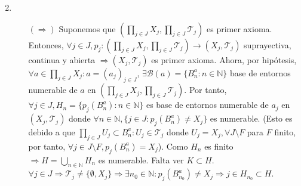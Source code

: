 \begin{dem}
  \begin{enumerate}[label=(\roman*)]
    \item []
    \item \begin{enumerate}[label=(\roman*)]
      \item []
      \item [$(\Rightarrow)$] Suponemos que $( \prod_{j \in J} X_{j}, \prod_{j \in J} \mathcal{T}_{j} )$ es primer axioma. Entonces, $\forall j \in J, p_{j} : ( \prod_{j \in J} X_{j}, \prod_{j \in J} \mathcal{T}_{j} ) \to ( X_{j}, \mathcal{T}_{j} )$ suprayectiva, continua y abierta $\Rightarrow ( X_{j}, \mathcal{T}_{j} )$ es primer axioma. Ahora, por hipótesis, $\forall a \in \prod_{j \in J} X_{j} : a = ( a_{j} )_{j \in J}$, $\exists \mathcal{B}(a) = \{ B_{n}^{a} : n \in \mathbb{N} \}$ base de entornos numerable de $a$ en $( \prod_{j \in J} X_{j}, \prod_{j \in J} \mathcal{T}_{j} )$. Por tanto, $\forall j \in J, H_{n} = \{ p_{j}(B_{n}^{a}) : n \in \mathbb{N} \}$ es base de entornos numerable de $a_{j}$ en $( X_{j}, \mathcal{T}_{j} )$ donde $\forall n \in \mathbb{N}, \{ j \in J : p_{j}(B^{a}_{n}) \neq X_{j} \}$ es numerable. (Esto es debido a que $\prod_{j \in J} U_{j} \subset B^{a}_{n} : U_{j} \in \mathcal{T}_{j}$ donde $U_{j} = X_{j}, \forall J \setminus F$ para $F$ finito, por tanto, $\forall j \in J \setminus F, p_{j}(B^{a}_{n}) = X_{j}$). Como $H_{n}$ es finito $\Rightarrow H = \bigcup_{n \in \mathbb{N}} H_{n}$ es numerable. Falta ver $K \subset H$. $\forall j \in J \Rightarrow \mathcal{T}_{j} \neq \{ \emptyset, X_{j} \} \Rightarrow \exists n_{0} \in \mathbb{N} : p_{j}(B^{a}_{ n_{ 0 } }) \neq X_{j} \Rightarrow j \in H_{ n_{ 0 } } \subset H$.


\end{enumerate}
\end{enumerate}
\end{dem}
